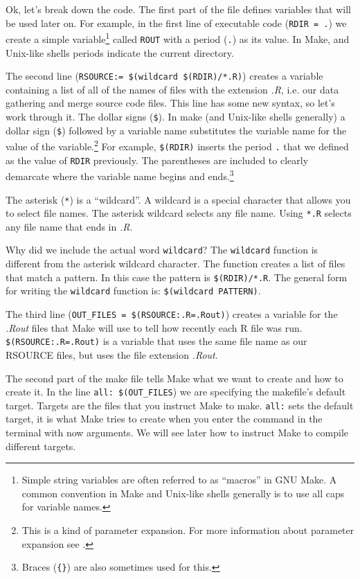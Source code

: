 \noindent Ok, let's break down the code. The first part of the file defines variables that will be used later on. For example, in the first line of executable code (\texttt{RDIR = .}) we create a simple variable\footnote{Simple string variables are often referred to as ``macros'' in GNU Make. A common convention in Make and Unix-like shells generally is to use all caps for variable names.} called \texttt{ROUT} with a period (\texttt{.}) as its value. In Make, and Unix-like shells periods indicate the current directory. 

The second line (\verb|RSOURCE:= $(wildcard $(RDIR)/*.R)|) creates a variable containing a list of all of the names of files with the extension \emph{.R}, i.e. our data gathering and merge source code files. This line has some new syntax, so let's work through it. The dollar signs (\verb|$|). In make (and Unix-like shells generally) a dollar sign (\verb|$|) followed by a variable name substitutes the variable name for the value of the variable.\footnote{This is a kind of parameter expansion. For more information about parameter expansion see \citep{Frazier2008}.} For example, \verb|$(RDIR)| inserts the period \texttt{.} that we defined as the value of \texttt{RDIR} previously. The parentheses are included to clearly demarcate where the variable name begins and ends.\footnote{Braces (\texttt{\{\}}) are also sometimes used for this.} 

The asterisk (\verb|*|) is a ``wildcard''. A wildcard is a special character that allows you to select file names. The asterisk wildcard selects any file name. Using \verb|*.R| selects any file name that ends in \emph{.R}.  

Why did we include the actual word \texttt{wildcard}? The \texttt{wildcard} function is different from the asterisk wildcard character. The function creates a list of files that match a pattern. In this case the pattern is \verb|$(RDIR)/*.R|. The general form for writing the \texttt{wildcard} function is: \verb|$(wildcard PATTERN)|.

The third line (\verb|OUT_FILES = $(RSOURCE:.R=.Rout)|) creates a variable for the \emph{.Rout} files that Make will use to tell how recently each R file was run. \verb|$(RSOURCE:.R=.Rout)| is a variable that uses the same file name as our RSOURCE files, but uses the file extension \emph{.Rout}.

The second part of the make file tells Make what we want to create and how to create it. In the line \verb|all: $(OUT_FILES|) we are specifying the makefile's default target. Targets are the files that you instruct Make to make. \texttt{all:} sets the default target, it is what Make tries to create when you enter the command  in the terminal with now arguments. We will see later how to instruct Make to compile different targets.

